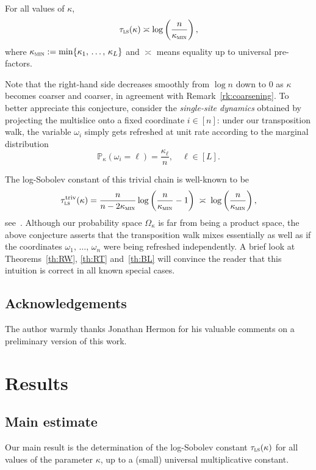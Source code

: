\documentclass[10pt]{amsart}
\theoremstyle{definition}\newtheorem{defi}[theo]{Definition}\newtheorem{rema}[theo]{Remark}\newtheorem{exam}[theo]{Example}\newtheorem{exem}[theo]{Example}\newtheorem{nota}[theo]{Notation}
\newcommand{\PP}{\mathbb{P}}
\newcommand{\tls}{\tau_{\textsc{ls}}}
\newcommand{\am}{{\kappa_{\textsc{min}}}}
\DeclareMathOperator{\triv}{triv}
\begin{document}
\begin{conj}\label{cj:main}
For all values of $\kappa$,
\[
\tls(\kappa) \asymp \log \left(\frac{n}{\am}\right),
\]
where $\am:=\min\{\kappa_1,\,\ldots,\,\kappa_L\}$ and $\asymp$ means equality up to universal pre-factors.
\end{conj}

Note that the right-hand side decreases smoothly from $\log n $ down to $0$ as $\kappa$ becomes coarser and coarser, in agreement with Remark~\ref{rk:coarsening}. To better appreciate this conjecture, consider the \emph{single-site dynamics} obtained by projecting the multislice onto a fixed coordinate $i\in[n]$: under our transposition walk, the variable $\omega_i$ simply gets refreshed at unit rate according to the marginal distribution
\[
\PP_\kappa\left(\omega_i=\ell\right) = \frac{\kappa_\ell}{n},\quad \ell\in[L].
\]

The log-Sobolev constant of this trivial chain is well-known to be
\[
\tls^{\triv}(\kappa) = \frac{n}{n-{2\am}}\log\left(\frac{n}{\am}-1\right) \; \asymp \; \log \left(\frac{n}{\am}\right),
\]
see~\cite[Theorem~A.1]{MR1410112}. Although our probability space $\Omega_\kappa$ is far from being a product space, the above conjecture asserts that the transposition walk mixes essentially as well as if the coordinates $\omega_1,\,\ldots,\,\omega_n$ were being refreshed independently. A brief look at Theorems~\ref{th:RW}, \ref{th:RT} and~\ref{th:BL} will convince the reader that this intuition is correct in all known special cases.


\subsection*{Acknowledgements}
The author warmly thanks Jonathan Hermon for his valuable comments on a preliminary version of this work.



\section{Results}

\subsection{Main estimate}\label{sec:appli}
Our main result is the determination of the log-Sobolev constant $\tls(\kappa)$ for all values of the parameter $\kappa$, up to a (small) universal multiplicative constant.
\end{document}
